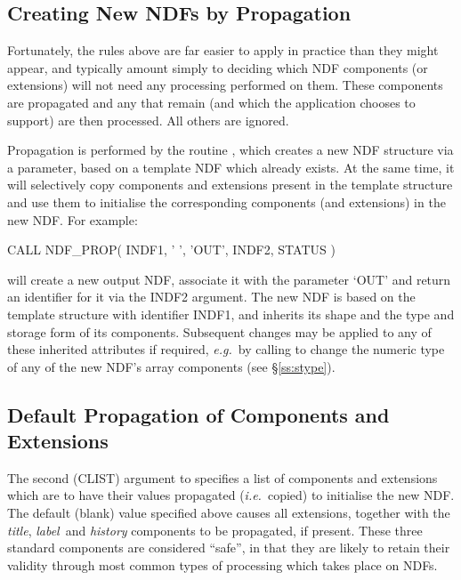 \documentclass[twoside,11pt,nolof]{starlink}
\providecommand{\st}[1]{{\emph{#1}}}
\begin{document}
\subsection{\label{ss:prop}Creating New NDFs by Propagation}

Fortunately, the rules above are far easier to apply in practice than they
might appear, and typically amount simply to deciding which NDF components
(or extensions) will not need any processing performed on them.
These components are propagated and any that remain (and which the
application chooses to support) are then processed.
All others are ignored.

Propagation is performed by the routine , which creates a new NDF
structure via a parameter, based on a template NDF which already exists.
At the same time, it will selectively copy components and extensions present
in the template structure and use them to initialise the corresponding
components (and extensions) in the new NDF.
For example:

\small
\begin{terminalv}
      CALL NDF_PROP( INDF1, ' ', 'OUT', INDF2, STATUS )
\end{terminalv}
\normalsize

will create a new output NDF, associate it with the parameter `OUT' and
return an identifier for it via the INDF2 argument.
The new NDF is based on the template structure with identifier INDF1, and
inherits its shape and the type and storage form of its components.
Subsequent changes may be applied to any of these inherited attributes if
required, \st{e.g.}\ by calling  to change the numeric type of any
of the new NDF's array components (see \S\ref{ss:stype}).

\subsection{\label{ss:defaultpropagation}Default Propagation of Components and Extensions}

The second (CLIST) argument to  specifies a list of
components and extensions which are to have their values propagated
(\st{i.e.}\ copied) to initialise the new NDF.
The default (blank) value specified above causes all extensions, together
with the \st{title}, \st{label\/}\ and \st{history\/} components to be
propagated, if present.
These three standard components are considered ``safe'', in that they are
likely to retain their validity through most common types of processing
which takes place on NDFs.
\end{document}
